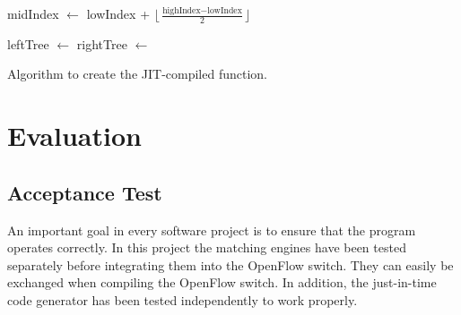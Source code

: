 \documentclass[conference]{IEEEtran}
\begin{document}
\begin{algorithm}
\begin{algorithmic}[1]
    \State midIndex $\gets$ lowIndex + $\lfloor\frac{\textrm{highIndex} - \textrm{lowIndex}}{2}\rfloor$
    
        \State {}
        \State {}
        \State {}
        \State {} 
        \State {}
    \EndIf
    
    \State leftTree $\gets$ 
    \State rightTree $\gets$ 
    
    \State {}
    \State {}
    \State {}
    \State {}
    \State {}
    \State {}
    \State {}
    \State {}
\EndFunction
\end{algorithmic}
\caption{Algorithm to create the JIT-compiled function.}
\label{alg:jit}
\end{algorithm}

\section{Evaluation}
\subsection{Acceptance Test}
An important goal in every software project is to ensure that the program operates correctly.
In this project the matching engines have been tested separately before integrating them into the OpenFlow switch.
They can easily be exchanged when compiling the OpenFlow switch.
In addition, the just-in-time code generator has been tested independently to work properly.
\end{document}
